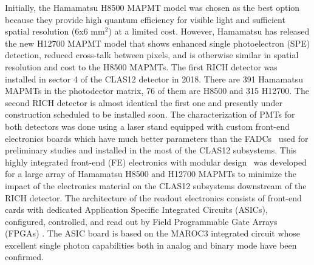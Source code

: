 Initially, the Hamamatsu H8500 MAPMT model \cite{H8500} was chosen as the best option because they provide high quantum efficiency for visible light and sufficient spatial resolution (6x6 mm$^2$) at a limited cost.
However, Hamamatsu has released the new H12700 MAPMT model  \cite{H12700} that shows enhanced single photoelectron (SPE) detection, reduced cross-talk between pixels, and is otherwise similar in spatial resolution and  cost to the H8500 MAPMTs.
The first RICH detector was installed in sector 4 of the CLAS12 detector in 2018.
There are 391 Hamamatsu MAPMTs  in the photodector matrix, 76 of them are H8500 and 315 H12700. 
The second RICH detector is almost identical the first one and presently under construction scheduled to be installed soon.
The characterization of PMTs for both detectors was done using a laser stand equipped with custom front-end electronics boards which have much better parameters than the FADCs~\cite{FADC250} used for preliminary studies and installed in the most of the CLAS12 subsystems.
This highly integrated front-end (FE) electronics with modular design~\cite{RICH_FE} was developed for a large array of Hamamatsu H8500 and H12700 MAPMTs to minimize the impact of the electronics material on the CLAS12 subsystems downstream of the RICH detector.
The architecture of the readout electronics consists of front-end cards with dedicated Application Specific Integrated Circuits (ASICs), configured, controlled, and read out by Field Programmable Gate Arrays (FPGAs) \cite{RICH_FE}.
The ASIC board is based on the MAROC3  integrated circuit \cite{MAROC} whose excellent single photon capabilities both in analog and binary mode have been confirmed.
